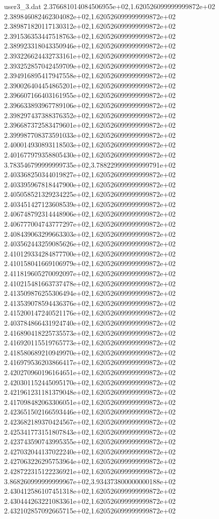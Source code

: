 \begin{filecontents}{user3_3.dat}
2.376681014084506955e+02,1.620526099999999872e+02
2.389846082462304082e+02,1.620526099999999872e+02
2.389871820117130312e+02,1.620526099999999872e+02
2.391536353447518763e+02,1.620526099999999872e+02
2.389923318043350946e+02,1.620526099999999872e+02
2.393226624432733161e+02,1.620526099999999872e+02
2.393252857042459709e+02,1.620526099999999872e+02
2.394916895417947558e+02,1.620526099999999872e+02
2.390026404454865201e+02,1.620526099999999872e+02
2.396607166403161955e+02,1.620526099999999872e+02
2.396633893967789106e+02,1.620526099999999872e+02
2.398297437388376352e+02,1.620526099999999872e+02
2.396687372583479601e+02,1.620526099999999872e+02
2.399987708373591033e+02,1.620526099999999872e+02
2.400014930893118503e+02,1.620526099999999872e+02
2.401677979358805430e+02,1.620526099999999872e+02
3.783546799999999735e+02,3.788229999999999791e+02
2.403368250344019827e+02,1.620526099999999872e+02
2.403395967818447900e+02,1.620526099999999872e+02
2.405058521329234225e+02,1.620526099999999872e+02
2.403451427123608539e+02,1.620526099999999872e+02
2.406748792314448906e+02,1.620526099999999872e+02
2.406777004743777297e+02,1.620526099999999872e+02
2.408439063299663303e+02,1.620526099999999872e+02
2.403562443259085626e+02,1.620526099999999872e+02
2.410129334284877700e+02,1.620526099999999872e+02
2.410158041669106979e+02,1.620526099999999872e+02
2.411819605270092097e+02,1.620526099999999872e+02
2.410215481663737478e+02,1.620526099999999872e+02
2.413509876255306494e+02,1.620526099999999872e+02
2.413539078594436376e+02,1.620526099999999872e+02
2.415200147240521176e+02,1.620526099999999872e+02
2.403784866431924740e+02,1.620526099999999872e+02
2.416890418225735573e+02,1.620526099999999872e+02
2.416920115519765773e+02,1.620526099999999872e+02
2.418580689210949970e+02,1.620526099999999872e+02
2.416979536203866417e+02,1.620526099999999872e+02
2.420270960196164651e+02,1.620526099999999872e+02
2.420301152445095170e+02,1.620526099999999872e+02
2.421961231181379048e+02,1.620526099999999872e+02
2.417098482063306051e+02,1.620526099999999872e+02
2.423651502166593446e+02,1.620526099999999872e+02
2.423682189370424567e+02,1.620526099999999872e+02
2.425341773151807843e+02,1.620526099999999872e+02
2.423743590743995355e+02,1.620526099999999872e+02
2.427032044137022240e+02,1.620526099999999872e+02
2.427063226295753964e+02,1.620526099999999872e+02
2.428722315122236921e+02,1.620526099999999872e+02
3.868260999999999967e+02,3.934373800000000188e+02
2.430412586107451318e+02,1.620526099999999872e+02
2.430444263221083361e+02,1.620526099999999872e+02
2.432102857092665715e+02,1.620526099999999872e+02

\end{filecontents}
